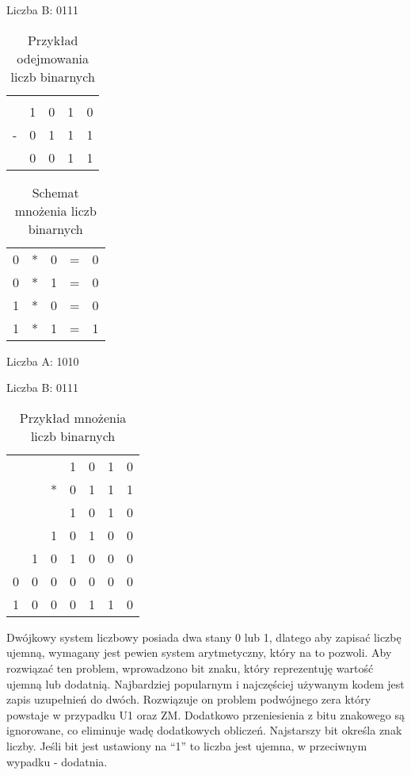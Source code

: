 \documentclass[12pt, a4paper, onside, polish]{article}				%
\begin{document}
Liczba B: 0111

\begin{table}[htb]
\caption{Przykład odejmowania liczb binarnych}
\centering
\begin{tabular}{lllll}
 &  &  &  &  \\
 & 1 & 0 & 1 & 0 \\
- & 0 & 1 & 1 & 1 \\ \hline
 & 0 & 0 & 1 & 1
\end{tabular}
\end{table}


\begin{table}[htb]
\caption{Schemat mnożenia liczb binarnych}
\centering
\begin{tabular}{lllll}
0 & * & 0 & = & 0 \\
0 & * & 1 & = & 0 \\
1 & * & 0 & = & 0 \\
1 & * & 1 & = & 1
\end{tabular}
\end{table}

Liczba A: 1010

Liczba B: 0111
\begin{table}[htb]
\caption{Przykład mnożenia liczb binarnych}
\centering
\begin{tabular}{lllllll}
 &  &  & 1 & 0 & 1 & 0 \\
 &  & * & 0 & 1 & 1 & 1 \\ \cline{3-7} 
 &  &  & 1 & 0 & 1 & 0 \\
 &  & 1 & 0 & 1 & 0 & 0 \\
 & 1 & 0 & 1 & 0 & 0 & 0 \\
0 & 0 & 0 & 0 & 0 & 0 & 0 \\ \hline
1 & 0 & 0 & 0 & 1 & 1 & 0 
\end{tabular}
\end{table}
\fi
Dwójkowy system liczbowy posiada dwa stany 0 lub 1, dlatego aby zapisać liczbę ujemną, wymagany jest pewien system arytmetyczny, który na to pozwoli. Aby rozwiązać ten problem, wprowadzono bit znaku, który reprezentuję wartość ujemną lub dodatnią. Najbardziej popularnym i najczęściej używanym kodem jest zapis uzupełnień do dwóch. Rozwiązuje on problem podwójnego zera który powstaje w przypadku U1 oraz ZM. Dodatkowo przeniesienia z bitu znakowego są ignorowane, co eliminuje wadę dodatkowych obliczeń. Najstarszy bit określa znak liczby. Jeśli bit jest ustawiony na “1” to liczba jest ujemna, w przeciwnym wypadku - dodatnia.  
\end{document}
